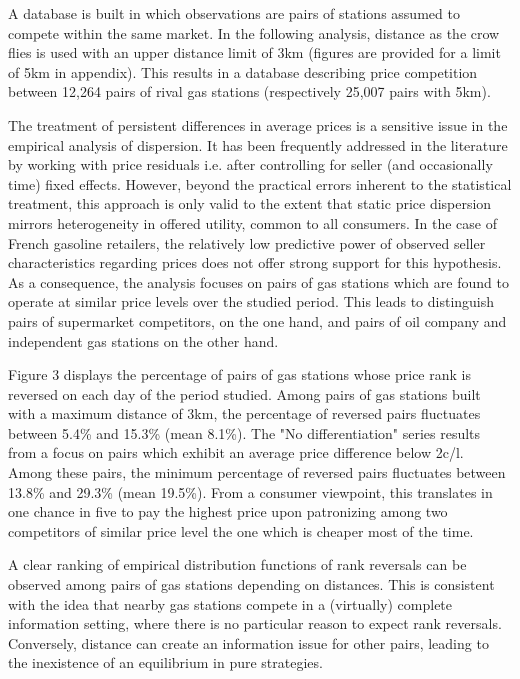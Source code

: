 \documentclass[english]{article}
\begin{document}
A database is built in which observations are pairs of stations assumed to compete within the same market. In the following analysis, distance as the crow flies is used with an upper distance limit of 3km (figures are provided for a limit of 5km in appendix). This results in a database describing price competition between 12,264 pairs of rival gas stations (respectively 25,007 pairs with 5km).

The treatment of persistent differences in average prices is a sensitive issue in the empirical analysis of dispersion. It has been frequently addressed in the literature by working with price residuals i.e. after controlling for seller (and occasionally time) fixed effects. However, beyond the practical errors inherent to the statistical treatment, this approach is only valid to the extent that static price dispersion mirrors heterogeneity in offered utility, common to all consumers. In the case of French gasoline retailers, the relatively low predictive power of observed seller characteristics regarding prices does not offer strong support for this hypothesis. As a consequence, the analysis focuses on pairs of gas stations which are found to operate at similar price levels over the studied period. This leads to distinguish pairs of supermarket competitors, on the one hand, and pairs of oil company and independent gas stations on the other hand.

Figure 3 displays the percentage of pairs of gas stations whose price rank is reversed on each day of the period studied. Among pairs of gas stations built with a maximum distance of 3km, the percentage of reversed pairs fluctuates between 5.4\% and 15.3\%  (mean 8.1\%). The "No differentiation" series results from a focus on pairs which exhibit an average price difference below 2c/l. Among these pairs, the minimum percentage of reversed pairs fluctuates between 13.8\% and 29.3\% (mean 19.5\%). From a consumer viewpoint, this translates in one chance in five to pay the highest price upon patronizing among two competitors of similar price level the one which is cheaper most of the time.

A clear ranking of empirical distribution functions of rank reversals can be observed among pairs of gas stations depending on distances. This is consistent with the idea that nearby gas stations compete in a (virtually) complete information setting, where there is no particular reason to expect rank reversals. Conversely, distance can create an information issue for other pairs, leading to the inexistence of an equilibrium in pure strategies.
\end{document}
